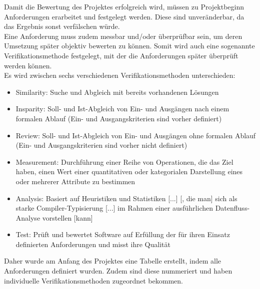 \label{Anforderungen}

Damit die Bewertung des Projektes erfolgreich wird, müssen zu Projektbeginn Anforderungen erarbeitet und festgelegt werden. Diese sind unveränderbar, da das Ergebnis sonst verfälschen würde. \\
Eine Anforderung muss zudem messbar und/oder überprüfbar sein, um deren Umsetzung später objektiv bewerten zu können. Somit wird auch eine sogenannte Verifikationsmethode festgelegt, mit der die Anforderungen später überprüft werden können. \\
Es wird zwischen sechs verschiedenen Verifikationsmethoden unterschieden:

\begin{itemize}
	\item Similarity: Suche und Abgleich mit bereits vorhandenen Lösungen \cite[S. 122]{HelgaMeyer.}
	\item Insparity: Soll- und Ist-Abgleich von Ein- und Ausgängen nach einem formalen Ablauf (Ein- und Ausgangskriterien sind vorher definiert) \cite[vgl. S. 308]{PeterLiggesmeyer.2009}
	\item Review: Soll- und Ist-Abgleich von Ein- und Ausgängen ohne formalen Ablauf (Ein- und Ausgangskriterien sind vorher nicht definiert) \cite[vgl. S. 317]{PeterLiggesmeyer.2009}
	\item Measurement: Durchführung einer Reihe von Operationen, die das Ziel haben, einen Wert einer quantitativen oder kategorialen Darstellung eines oder mehrerer Attribute zu bestimmen \cite[vgl. S. 395]{DepartmentofResearch&DevelopmentDepartmentofInformationTechnologiesandSystems.}
	\item Analysis: Basiert auf Heuristiken und Statistiken [...] [, die man] sich als starke Compiler-Typisierung [...] im Rahmen einer ausführlichen Datenfluss-Analyse vorstellen [kann] \cite[vgl. S. 4]{JayAbrahamPaulJonesRaoulJetley.}
	\item Test: Prüft und bewertet Software auf Erfüllung der für ihren Einsatz definierten Anforderungen und misst ihre Qualität \cite{Wikipedia.01.03.2020}
\end{itemize}

Daher wurde am Anfang des Projektes eine Tabelle erstellt, indem alle Anforderungen definiert wurden. Zudem sind diese nummeriert und haben individuelle Verifikationsmethoden zugeordnet bekommen. \\

